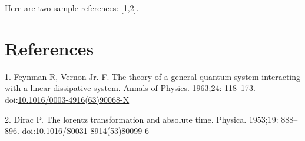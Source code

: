 \documentclass[10pt,letterpaper]{article}
\begin{document}
Here are two sample references: {[}1,2{]}.

\section*{References}\label{references}

\hypertarget{refs}{}
\hypertarget{ref-Feynman1963118}{}
1. Feynman R, Vernon Jr. F. The theory of a general quantum system
interacting with a linear dissipative system. Annals of Physics.
1963;24: 118--173.
doi:\href{https://doi.org/10.1016/0003-4916(63)90068-X}{10.1016/0003-4916(63)90068-X}

\hypertarget{ref-Dirac1953888}{}
2. Dirac P. The lorentz transformation and absolute time. Physica.
1953;19: 888--896.
doi:\href{https://doi.org/10.1016/S0031-8914(53)80099-6}{10.1016/S0031-8914(53)80099-6}

\nolinenumbers
\end{document}
